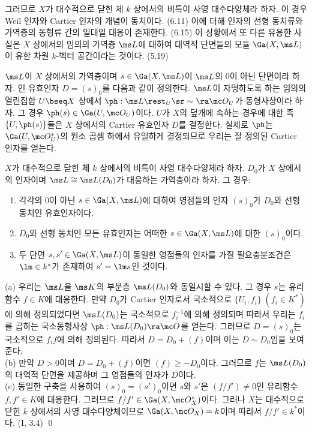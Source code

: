	그러므로 $X$가 대수적으로 닫힌 체 $k$ 상에서의 비특이 사영 대수다양체라 하자.
	이 경우 Weil 인자와 Cartier 인자의 개념이 동치이다. (6.11)
	이에 더해 인자의 선형 동치류와 가역층의 동형류 간의 일대일 대응이 존재한다. (6.15)
	이 상황에서 또 다른 유용한 사실은 $X$ 상에서의 임의의 가역층 $\ms L$에 대하여
	대역적 단면들의 모듈 $\Ga(X,\ms L)$이 유한 차원 $k$-벡터 공간이라는 것이다. (5.19)
	
	$\ms L$이 $X$ 상에서의 가역층이며 $s\in\Ga(X,\ms L)$이 $\ms L$의 0이 아닌 단면이라 하자.
	인 유효인자 $D=(s)_0$를 다음과 같이 정의한다.
	$\ms L$이 자명하도록 하는 임의의 열린집합 $U\bseq X$ 상에서 $\ph:\ms L\rest_U\sr\sim\ra\mc O_U$가 동형사상이라 하자.
	그 경우 $\ph(s)\in\Ga(U,\mc O_U)$이다. $U$가 $X$의 덮개에 속하는 경우에 대한 족 $\{U,\ph(s)\}$들은
	$X$ 상에서의 Cartier 유효인자 $D$를 결정한다.
	실제로 $\ph$는 $\Ga(U,\mc O_U^*)$의 원소 곱셈 하에서 유일하게 결정되므로 우리는 잘 정의된 Cartier 인자를 얻는다.
	
	
	\begin{proposition}
	$X$가 대수적으로 닫힌 체 $k$ 상에서의 비특이 사영 대수다양체라 하자.
	$D_0$가 $X$ 상에서의 인자이며 $\ms L\cong\ms L(D_0)$가 대응하는 가역층이라 하자. 그 경우:
	\begin{enumerate}[label=(\alph*)]
	\item 각각의 0이 아닌 $s\in\Ga(X,\ms L)$에 대하여 영점들의 인자 $(s)_0$가 $D_0$와 선형 동치인 유효인자이다.
	\item $D_0$와 선형 동치인 모든 유효인자는 어떠한 $s\in\Ga(X,\ms L)$에 대한 $(s)_0$이다.
	\item 두 단면 $s,s'\in\Ga(X,\ms L)$이 동일한 영점들의 인자를 가질 필요충분조건은 $\lm\in k^*$가 존재하여 $s'=\lm s$인 것이다.\\
	\end{enumerate}
	\pf (a) 우리는 $\ms L$을 $\ms K$의 부분층 $\ms L(D_0)$와 동일시할 수 있다. 그 경우 $s$는 유리함수 $f\in K$에 대응한다.
	만약 $D_0$가 Cartier 인자로서 국소적으로 $\{U_i,f_i\}\;(f_i\in K^*)$에 의해 정의되었다면 $\ms L(D_0)$는 국소적으로
	$f_i^{-1}$에 의해 정의되며 따라서 우리는 $f_i$를 곱하는 국소동형사상 $\ph:\ms L(D_0)\ra\mc O$를 얻는다.
	그러므로 $D=(s)_0$는 국소적으로 $f_if$에 의해 정의된다. 따라서 $D=D_0+(f)$이며 이는 $D\sim D_0$임을 보여준다.\\
	(b) 만약 $D>0$이며 $D=D_0+(f)$이면 $(f)\ge -D_0$이다.
	그러므로 $f$는 $\ms L(D_0)$의 대역적 단면을 제공하며 그 영점들의 인자가 $D$이다.\\
	(c) 동일한 구축을 사용하여 $(s)_0=(s')_0$이면 $s$와 $s'$은 $(f/f')\ne 0$인 유리함수 $f,f'\in K$에 대응한다.
	그러므로 $f/f'\in\Ga(X,\mc O_X^*)$이다.
	그러나 $X$는 대수적으로 닫힌 $k$ 상에서의 사영 대수다양체이므로 $\Ga(X,\mc O_X)=k$이며 따라서 $f/f'\in k^*$이다. (I, 3.4)
	\qed
	\end{proposition}
	
